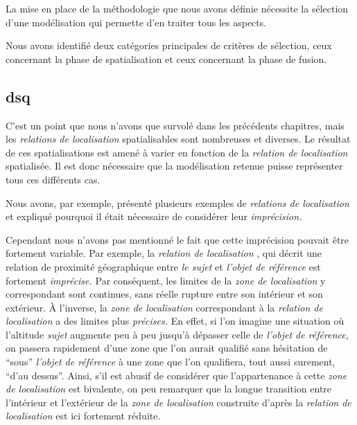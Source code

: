 La mise en place de la méthodologie que nous avons définie nécessite
la sélection d'une modélisation qui permette d'en traiter tous les
aspects.

Nous avons identifié deux catégories principales de critères de
sélection, ceux concernant la phase de spatialisation et ceux
concernant la phase de fusion.

\subsection{dsq}

C'est un point que nous n'avons que survolé dans les précédents
chapitres, mais les \emph{relations de localisation} spatialisables
sont nombreuses et diverses. Le résultat de ces spatialisations est
amené à varier en fonction de la \emph{relation de localisation}
spatialisée. Il est donc nécessaire que la modélisation retenue puisse
représenter tous ces différents cas.


Nous avons, par exemple, présenté plusieurs exemples de
\emph{relations de localisation} et expliqué pourquoi il était
nécessaire de considérer leur \emph{imprécision.}

Cependant nous n'avons pas mentionné le fait que cette imprécision
pouvait être fortement variable. Par exemple, la \emph{relation de
  localisation} , qui décrit une relation de
proximité géographique entre \emph{le sujet} et \emph{l'objet de
  référence} est fortement \emph{imprécise.} Par conséquent, les
limites de la \emph{zone de localisation} y correspondant sont
continues, sans réelle rupture entre son intérieur et son extérieur. À
l'inverse, la \emph{zone de localisation} correspondant à la
\emph{relation de localisation}  a des
limites plus \emph{précises.} En effet, si l'on imagine une situation
où l'altitude \emph{sujet} augmente peu à peu jusqu'à dépasser celle
de \emph{l'objet de référence,} on passera rapidement d'une zone que
l'on aurait qualifié sans hésitation de \enquote{sous} \emph{l'objet
  de référence} à une zone que l'on qualifiera, tout aussi surement,
\enquote{d'au dessus}. Ainsi, s'il est abusif de considérer que
l'appartenance à cette \emph{zone de localisation} est bivalente, on
peu remarquer que la longue transition entre l'intérieur et
l'extérieur de la \emph{zone de localisation} construite
d'après la \emph{relation de localisation}  est
ici fortement réduite.

